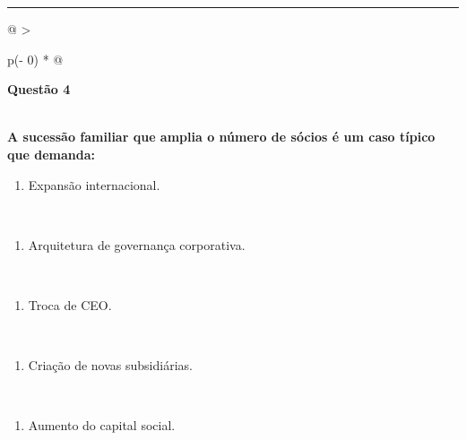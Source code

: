 \documentclass[
]{book}
\providecommand{\tightlist}{%
  \setlength{\itemsep}{0pt}\setlength{\parskip}{0pt}}
\begin{document}
\begin{center}\rule{0.5\linewidth}{0.5pt}\end{center}

\begin{longtable}[]{@{}
  >{\raggedright\arraybackslash}p{(\columnwidth - 0\tabcolsep) * }@{}}
\toprule\noalign{}
\begin{minipage}[b]{\linewidth}\raggedright
\textbf{Questão 4}
\end{minipage} \\
\midrule\noalign{}
\endhead
\bottomrule\noalign{}
\endlastfoot
\textbf{A sucessão familiar que amplia o número de sócios é um caso típico que demanda:} \\
\begin{minipage}[t]{\linewidth}\raggedright
\begin{enumerate}
\def\labelenumi{\alph{enumi})}
\tightlist
\item
  Expansão internacional.
\end{enumerate}
\end{minipage} \\
\begin{minipage}[t]{\linewidth}\raggedright
\begin{enumerate}
\def\labelenumi{\alph{enumi})}
\setcounter{enumi}{1}
\tightlist
\item
  Arquitetura de governança corporativa.
\end{enumerate}
\end{minipage} \\
\begin{minipage}[t]{\linewidth}\raggedright
\begin{enumerate}
\def\labelenumi{\alph{enumi})}
\setcounter{enumi}{2}
\tightlist
\item
  Troca de CEO.
\end{enumerate}
\end{minipage} \\
\begin{minipage}[t]{\linewidth}\raggedright
\begin{enumerate}
\def\labelenumi{\alph{enumi})}
\setcounter{enumi}{3}
\tightlist
\item
  Criação de novas subsidiárias.
\end{enumerate}
\end{minipage} \\
\begin{minipage}[t]{\linewidth}\raggedright
\begin{enumerate}
\def\labelenumi{\alph{enumi})}
\setcounter{enumi}{4}
\tightlist
\item
  Aumento do capital social.
\end{enumerate}
\end{minipage} \\
\end{longtable}
\end{document}
